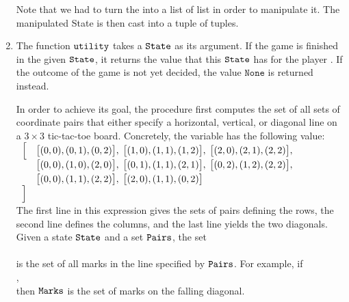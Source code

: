 \begin{enumerate}
      Note that we had to turn the  into a list of list in order to manipulate it.
      The manipulated State is then cast into a tuple of tuples.
\item The function $\texttt{utility}$ takes a $\texttt{State}$ as its argument.  If the game is 
      finished in the given $\texttt{State}$, it returns the value that this $\texttt{State}$ has for the
      player .  If the outcome of the game is not yet decided, the value $\mathtt{None}$
      is returned instead. 
 
      In order to achieve its goal, the procedure first computes the set of all sets of coordinate pairs that 
      either specify a horizontal, vertical, or diagonal line on a $3 \times 3$ tic-tac-toe board.  Concretely,
      the variable  has the following value:
      \\[0.2cm]
      \hspace*{1.3cm}
      $
      \begin{array}{ll}
       \Bigl[ & \bigl[(0, 0), (0, 1), (0, 2)\bigr], \;
                \bigl[(1, 0), (1, 1), (1, 2)\bigr], \;
                \bigl[(2, 0), (2, 1), (2, 2)\bigr],   \\[0.1cm]
              & \bigl[(0, 0), (1, 0), (2, 0)\bigr], \;
                \bigl[(0, 1), (1, 1), (2, 1)\bigr], \;
                \bigl[(0, 2), (1, 2), (2, 2)\bigr],   \\[0.1cm]
              & \bigl[(0, 0), (1, 1), (2, 2)\bigr], \;
                \bigl[(2, 0), (1, 1), (0, 2)\bigr]    \\
       \Bigr]
      \end{array}
      $
      \\[0.2cm]
      The first line in this expression gives the sets of pairs defining the rows, the second line defines 
      the columns, and the last line yields the two diagonals.  Given a state $\texttt{State}$ and a set
      $\texttt{Pairs}$, the set 
      \\[0.2cm]
      \hspace*{1.3cm}
      \\[0.2cm]
      is the set of all marks in the line specified by $\texttt{Pairs}$.  For example, if 
      \\[0.2cm]
      \hspace*{1.3cm}
      ,
      \\[0.2cm]
      then $\texttt{Marks}$ is the set of marks on the falling diagonal.

\end{enumerate}
